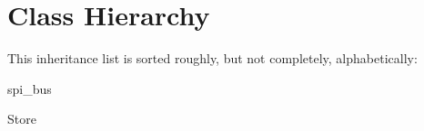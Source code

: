 \section{Class Hierarchy}
This inheritance list is sorted roughly, but not completely, alphabetically\+:\begin{DoxyCompactList}
\item {}
\item {}
\item {}
\item spi\+\_\+bus\begin{DoxyCompactList}
\item {}
\end{DoxyCompactList}
\item Store\begin{DoxyCompactList}
\item {}
\end{DoxyCompactList}
\end{DoxyCompactList}
